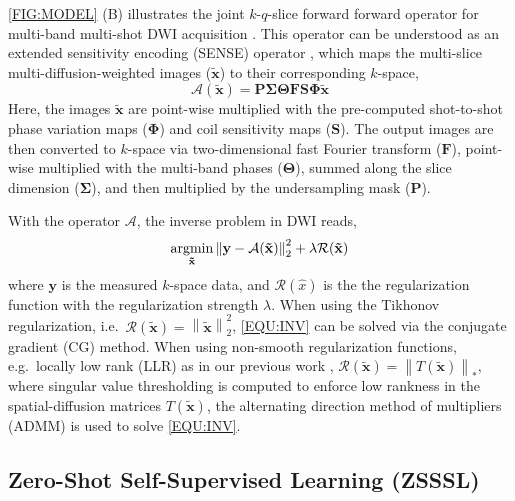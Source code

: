 \documentclass[journal,twoside,web]{ieeecolor}
\newcommand{\argmin}{\operatornamewithlimits{argmin}}
\newcommand{\norm}[1]{\left\lVert#1\right\rVert}
\begin{document}
    \cref{FIG:MODEL} (B) illustrates the joint $k$-$q$-slice forward forward operator
    for multi-band multi-shot DWI acquisition \cite{tan_2024_naviepi}.
    This operator can be understood as
    an extended sensitivity encoding (SENSE) operator \cite{pruessmann_2001_gsense},
    which maps the multi-slice multi-diffusion-weighted images ($\mathbf{\tilde{x}}$)
    to their corresponding $k$-space,
    \begin{equation}
        \mathcal{A}(\mathbf{\tilde{x}}) = \mathbf{P \Sigma \Theta F S \Phi} \mathbf{\tilde{x}}
        \label{EQU:FWD}
    \end{equation}
    Here, the images $\mathbf{\tilde{x}}$ are point-wise multiplied
    with the pre-computed shot-to-shot phase variation maps ($\mathbf{\Phi}$)
    and coil sensitivity maps ($\mathbf{S}$).
    The output images are then converted to $k$-space
    via two-dimensional fast Fourier transform ($\mathbf{F}$),
    point-wise multiplied with the multi-band phases ($\mathbf{\Theta}$),
    summed along the slice dimension ($\mathbf{\Sigma}$),
    and then multiplied by the undersampling mask ($\mathbf{P}$).

    With the operator $\mathcal{A}$, the inverse problem in DWI reads,
    \begin{equation}
        \argmin_{\mathbf{\tilde{x}}} \norm{\mathbf{y} - \mathcal{A}(\mathbf{\tilde{x}})}_2^2 + \lambda \mathcal{R}(\mathbf{\tilde{x}})
        \label{EQU:INV}
    \end{equation}
    where $\mathbf{y}$ is the measured $k$-space data,
    and $\mathcal{R}(\hat{x})$ is the the regularization function
    with the regularization strength $\lambda$.
    When using the Tikhonov regularization,
    i.e.~$\mathcal{R}(\mathbf{\tilde{x}}) = \norm{\mathbf{\tilde{x}}}_2^2$,
    \cref{EQU:INV} can be solved via the conjugate gradient (CG) method.
    When using non-smooth regularization functions,
    e.g.~locally low rank (LLR) as in our previous work \cite{tan_2024_naviepi},
    $\mathcal{R}(\mathbf{\tilde{x}}) = \norm{T(\mathbf{\tilde{x}})}_*$,
    where singular value thresholding \cite{cai_2010_svt} is computed
    to enforce low rankness in the spatial-diffusion matrices $T(\mathbf{\tilde{x}})$,
    the alternating direction method of multipliers (ADMM) \cite{boyd_2010_admm}
    is used to solve \cref{EQU:INV}.


    \subsection{Zero-Shot Self-Supervised Learning (ZSSSL)}
\end{document}
